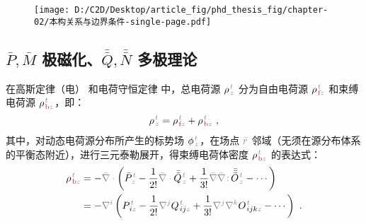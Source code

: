 \begin{figure}[htbp!]
	\centering
	\texttt{[image: D:/C2D/Desktop/article\_fig/phd\_thesis\_fig/chapter-02/本构关系与边界条件-single-page.pdf]}
\end{figure}

\vspace*{-5.5em}

\subsection{$\bar{P},\bar{M}$ 极磁化、$\bar{\bar{Q}},\bar{\bar{N}}$ 多极理论}\label{ssec:PMQN}

在高斯定律（电）  和电荷守恒定律  中，总电荷源 ${\rho}^{\;\!\mathcolor{gray}{t}}_{\;\!\mathcolor{gray}{z}}$ 分为自由电荷源 ${\rho}^{\;\!\mathcolor{gray}{t}}_{\;\!\textcolor{Maroon}{\text{f}}\mathcolor{gray}{z}}$ 和束缚电荷源 ${\rho}^{\;\!\mathcolor{gray}{t}}_{\;\!\textcolor{Maroon}{\text{b}}\mathcolor{gray}{z}}$\cite{langeMultipoleTheoryHehl2015,raabMultipoleTheoryElectromagnetism2004}，即：
\begin{align} \label{eq:p=f+b}
	{\rho}^{\;\!\mathcolor{gray}{t}}_{\;\!\mathcolor{gray}{z}} = {\rho}^{\;\!\mathcolor{gray}{t}}_{\;\!\textcolor{Maroon}{\text{f}}\mathcolor{gray}{z}} + {\rho}^{\;\!\mathcolor{gray}{t}}_{\;\!\textcolor{Maroon}{\text{b}}\mathcolor{gray}{z}}~,
\end{align}
其中，对动态电荷源分布所产生的标势场 $\phi^{\;\!\mathcolor{gray}{t}}_{\;\!\mathcolor{gray}{z}}$，在场点 $\mathcolor{gray}{\bar{r}}$ 邻域（无须在源分布体系的平衡态附近），进行三元泰勒展开，得束缚电荷体密度 ${\rho}^{\;\!\mathcolor{gray}{t}}_{\;\!\textcolor{Maroon}{\text{b}}\mathcolor{gray}{z}}$ 的表达式\cite{raabMultipoleTheoryElectromagnetism2004,delangeTranslationalInvariancePost2012,chen-zhuChenZhuxieUndergraduate_courses2024}：
\begin{subequations}
\begin{align}
	{\rho}^{\;\!\mathcolor{gray}{t}}_{\;\!\textcolor{Maroon}{\text{b}}\mathcolor{gray}{z}} &= - \mathcolor{gray}{\bar{\nabla} \cdot} \left( \bar{P}^{\;\!\mathcolor{gray}{t}}_{\;\!\mathcolor{gray}{z}} - \frac{1}{2!} \mathcolor{gray}{\bar{\nabla} \cdot} \bar{\bar{Q}}^{\;\!\mathcolor{gray}{t}}_{\;\!\mathcolor{gray}{z}} + \frac{1}{3!} \mathcolor{gray}{\bar{\nabla}} \mathcolor{gray}{\bar{\nabla} \colon}\! \bar{\bar{\bar{O}}}^{\;\!\mathcolor{gray}{t}}_{\;\!\mathcolor{gray}{z}} - \cdots \right) \label{eq:P-b} \\
	&= - \mathcolor{gray}{\nabla^i} \left( P^{\;\!\mathcolor{gray}{t}}_{\;\! i\mathcolor{gray}{z}} - \frac{1}{2!} \mathcolor{gray}{\nabla^j} Q^{\;\!\mathcolor{gray}{t}}_{\;\! ij\mathcolor{gray}{z}} + \frac{1}{3!} \mathcolor{gray}{\nabla^j} \mathcolor{gray}{\nabla^k} O^{\;\!\mathcolor{gray}{t}}_{\;\! ijk\mathcolor{gray}{z}} - \cdots \right)~. \label{eq:p-b}
\end{align}
\end{subequations}

